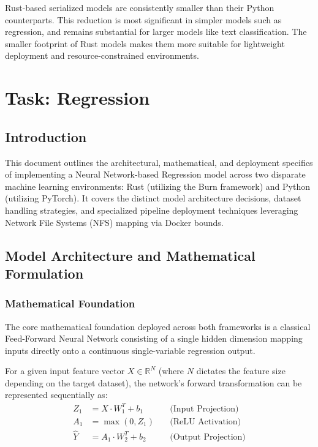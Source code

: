 \documentclass[10pt,a4paper,twocolumn]{article}
\begin{document}
\noindent
Rust-based serialized models are consistently smaller than their Python counterparts. This reduction is most significant in simpler models such as regression, and remains substantial for larger models like text classification. The smaller footprint of Rust models makes them more suitable for lightweight deployment and resource-constrained environments.

\clearpage

\section{Task: Regression}
\newpage

\subsection{Introduction}
This document outlines the architectural, mathematical, and deployment specifics of implementing a Neural Network-based Regression model across two disparate machine learning environments: Rust (utilizing the Burn framework) and Python (utilizing PyTorch). It covers the distinct model architecture decisions, dataset handling strategies, and specialized pipeline deployment techniques leveraging Network File Systems (NFS) mapping via Docker bounds.

\subsection{Model Architecture and Mathematical Formulation}

\subsubsection{Mathematical Foundation}
The core mathematical foundation deployed across both frameworks is a classical Feed-Forward Neural Network consisting of a single hidden dimension mapping inputs directly onto a continuous single-variable regression output.

For a given input feature vector $X \in \mathbb{R}^N$ (where $N$ dictates the feature size depending on the target dataset), the network's forward transformation can be represented sequentially as:
\begin{align}
    Z_1 &= X \cdot W_1^T + b_1 \quad &\text{(Input Projection)} \\
    A_1 &= \max(0, Z_1)        \quad &\text{(ReLU Activation)} \\
    \hat{Y} &= A_1 \cdot W_2^T + b_2 \quad &\text{(Output Projection)}
\end{align}
\end{document}
